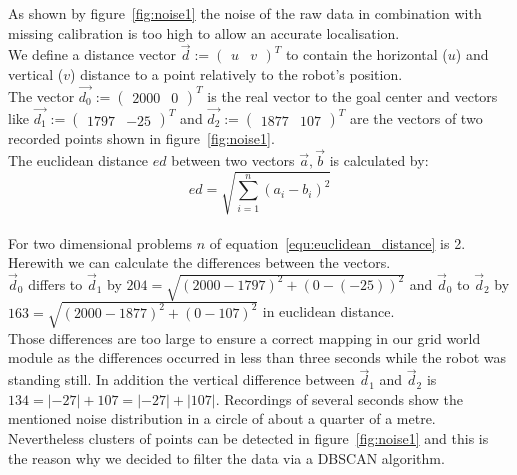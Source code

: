 \documentclass[lnicst,a4paper]{svmultln}
\begin{document}
As shown by figure~\ref{fig:noise1} the noise of the raw data in combination with missing calibration is too high to allow an accurate localisation.
\\
We define a distance vector $\vec{d} := \left( \begin{array}{cc} u & v \end{array} \right)^{T}$ to contain the horizontal ($u$) and vertical ($v$) distance to a point relatively to the robot's position. 
\\
The vector 
$\vec{d_{0}} := \left( \begin{array}{cc} 2000 & 0 \end{array} \right)^{T}$ is the real vector to the goal center and vectors like
$\vec{d_{1}} := \left( \begin{array}{cc} 1797 & -25 \end{array} \right)^{T}$ and
$\vec{d_{2}} := \left( \begin{array}{cc} 1877 & 107 \end{array} \right)^{T}$
are the vectors of two recorded points shown in figure~\ref{fig:noise1}.
\\
The euclidean distance $ed$ between two vectors $\vec{a}, \vec{b}$ is calculated by:
\\
\begin{equation}
\label{equ:euclidean_distance}
ed = \sqrt{\sum_{i=1}^{n} (a_i - b_i)^2}
\end{equation}
\\
For two dimensional problems $n$ of equation~\ref{equ:euclidean_distance} is 2. Herewith we can calculate the differences between the vectors.
\\
$\vec{d}_{0}$ differs to $\vec{d}_{1}$ by
$ 204 = \sqrt{(2000 - 1797)^2 + (0 - (-25))^2}$ and 
$\vec{d}_{0}$ to $\vec{d}_{2}$
by $ 163 = \sqrt{(2000 - 1877)^2 + (0 - 107)^2}$
in euclidean distance.
\\
Those differences are too large to ensure a correct mapping in our grid world module as the differences occurred in less than three seconds while the robot was standing still. In addition the vertical difference between $\vec{d}_{1}$ and $\vec{d}_{2}$ is $ 134 = |-27| + 107 = |-27| + |107|$. Recordings of several seconds show the mentioned noise distribution in a circle of about a quarter of a metre.
\\
Nevertheless clusters of points can be detected in figure~\ref{fig:noise1} and this is the reason why we decided to filter the data via a DBSCAN algorithm.
\end{document}
